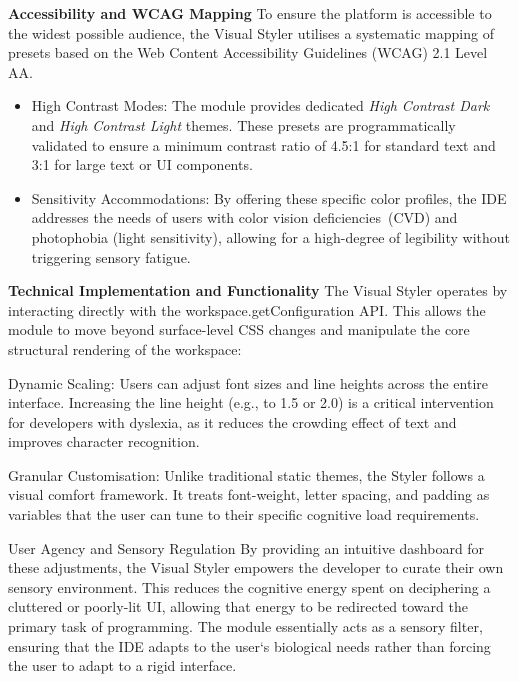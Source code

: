 \textbf{Accessibility and \gls{WCAG} Mapping}
\newline
To ensure the platform is accessible to the widest possible audience, the Visual Styler utilises a systematic mapping of presets based on the Web Content Accessibility Guidelines (WCAG) 2.1 Level AA.
\begin{itemize}
    \item High Contrast Modes: The module provides dedicated \textit{High Contrast Dark} and \textit{High Contrast Light} themes. These presets are programmatically validated to ensure a minimum contrast ratio of 4.5:1 for standard text and 3:1 for large text or UI components.
    \item Sensitivity Accommodations: By offering these specific color profiles, the \gls{IDE} addresses the needs of users with color vision deficiencies~(\gls{CVD}) and photophobia 
    (light sensitivity), allowing for a high-degree of legibility without triggering sensory fatigue.
\end{itemize}

\textbf{Technical Implementation and Functionality}
\newline
The Visual Styler operates by interacting directly with the workspace.getConfiguration \gls{API}. This allows the module to move beyond surface-level CSS changes and manipulate the core structural rendering of the workspace:

Dynamic Scaling: Users can adjust font sizes and line heights across the entire interface. Increasing the line height (e.g., to 1.5 or 2.0) is a critical intervention for developers with \gls{dyslexia}, as it reduces the crowding effect of text and improves character recognition.

Granular Customisation: Unlike traditional static themes, the Styler follows a visual comfort framework. It treats font-weight, letter spacing, and padding as variables that the user can tune to their specific cognitive load requirements.

User Agency and Sensory Regulation
By providing an intuitive dashboard for these adjustments, the Visual Styler empowers the developer to curate their own sensory environment. This reduces the cognitive energy spent on deciphering a cluttered or poorly-lit UI, allowing that energy to be redirected toward the primary task of programming. The module essentially acts as a sensory filter, ensuring that the \gls{IDE} adapts to the user`s biological needs rather than forcing the user to adapt to a rigid interface.

